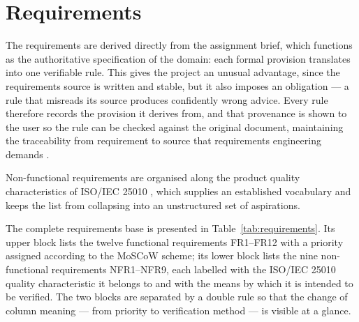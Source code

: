 \documentclass[a4paper,11pt]{article}
\begin{document}
\section{Requirements}\label{sec:requirements}

The requirements are derived directly from the assignment brief, which functions
as the authoritative specification of the domain: each formal provision
translates into one verifiable rule. This gives the project an unusual advantage,
since the requirements source is written and stable, but it also imposes an
obligation --- a rule that misreads its source produces confidently wrong advice.
Every rule therefore records the provision it derives from, and that provenance
is shown to the user so the rule can be checked against the original document,
maintaining the traceability from requirement to source that requirements
engineering demands \citep{Sommerville2020}.

Non-functional requirements are organised along the product quality
characteristics of ISO/IEC 25010 \citep{ISO25010}, which supplies an established
vocabulary and keeps the list from collapsing into an unstructured set of
aspirations.

The complete requirements base is presented in Table~\ref{tab:requirements}. Its
upper block lists the twelve functional requirements FR1--FR12 with a priority
assigned according to the MoSCoW scheme; its lower block lists the nine
non-functional requirements NFR1--NFR9, each labelled with the ISO/IEC 25010
quality characteristic it belongs to \citep{ISO25010} and with the means by
which it is intended to be verified. The two blocks are separated by a double
rule so that the change of column meaning --- from priority to verification
method --- is visible at a glance.
\end{document}
